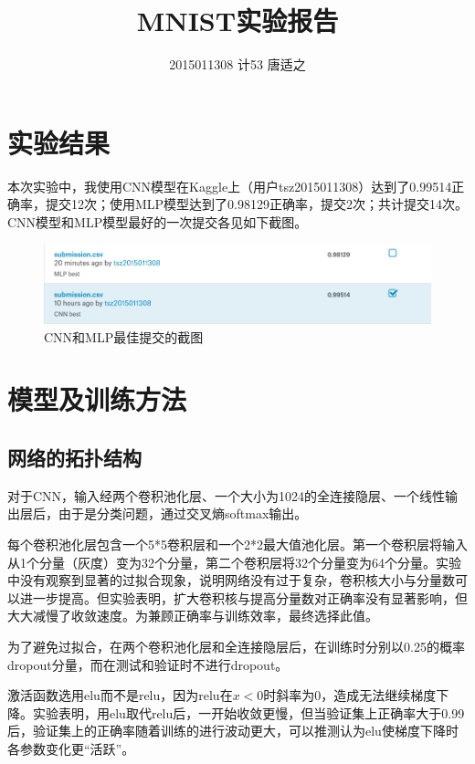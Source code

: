 \documentclass[UTF8]{ctexart}
\title{\huge MNIST实验报告}
\author{\large 2015011308 计53 唐适之}
\date{}
\begin{document}
    \maketitle

    \section{实验结果}

        本次实验中，我使用CNN模型在Kaggle上（用户tsz2015011308）达到了0.99514正确率，提交12次；使用MLP模型达到了0.98129正确率，提交2次；共计提交14次。CNN模型和MLP模型最好的一次提交各见如下截图。

    \begin{figure}[htp]
            \centering
            \includegraphics[width=\textwidth]{images/Screenshot.png}
            \caption{CNN和MLP最佳提交的截图}
        \end{figure}

    \section{模型及训练方法}

        \subsection{网络的拓扑结构}
            对于CNN，输入经两个卷积池化层、一个大小为1024的全连接隐层、一个线性输出层后，由于是分类问题，通过交叉熵softmax输出。

            每个卷积池化层包含一个5*5卷积层和一个2*2最大值池化层。第一个卷积层将输入从1个分量（灰度）变为32个分量，第二个卷积层将32个分量变为64个分量。实验中没有观察到显著的过拟合现象，说明网络没有过于复杂，卷积核大小与分量数可以进一步提高。但实验表明，扩大卷积核与提高分量数对正确率没有显著影响，但大大减慢了收敛速度。为兼顾正确率与训练效率，最终选择此值。

            为了避免过拟合，在两个卷积池化层和全连接隐层后，在训练时分别以0.25的概率dropout分量，而在测试和验证时不进行dropout。

            激活函数选用elu而不是relu，因为relu在$x<0$时斜率为0，造成无法继续梯度下降。实验表明，用elu取代relu后，一开始收敛更慢，但当验证集上正确率大于0.99后，验证集上的正确率随着训练的进行波动更大，可以推测认为elu使梯度下降时各参数变化更“活跃”。
\end{document}
